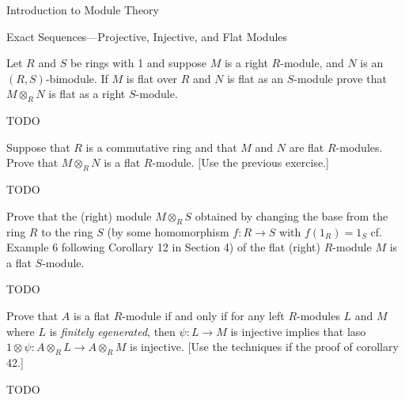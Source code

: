 \begin{chapter}{Introduction to Module Theory}
\begin{section}{Exact Sequences---Projective, Injective, and Flat Modules}
\begin{problem}\label{ex:10.5.21}
Let $R$ and $S$ be rings with 1 and suppose $M$ is a right $R$-module, and $N$ is an $(R,S)$-bimodule. If $M$ is flat over $R$ and $N$ is flat as an $S$-module prove that $M\otimes_R N$ is flat as a right $S$-module. 
\end{problem}
\begin{solution}TODO

\end{solution}\oneperpage



\begin{problem}\label{ex:10.5.22}
Suppose that $R$ is a commutative ring and that $M$ and $N$ are flat $R$-modules. Prove that $M\otimes_R N$ is a flat $R$-module. [Use the previous exercise.]
\end{problem}
\begin{solution}TODO

\end{solution}\oneperpage



\begin{problem}\label{ex:10.5.23}
Prove that the (right) module $M\otimes_R S$ obtained by changing the base from the ring $R$ to the ring $S$ (by some homomorphism $f:R\to S$ with $f(1_R) = 1_S$ cf. Example 6 following Corollary 12 in Section 4) of the flat (right) $R$-module $M$ is a flat $S$-module.
\end{problem}
\begin{solution}TODO

\end{solution}\oneperpage



\begin{problem}\label{ex:10.5.24}
Prove that $A$ is a flat $R$-module if and only if for any left $R$-modules $L$ and $M$ where $L$ is \emph{finitely egenerated}, then $\psi:L\to M$ is injective implies that laso $1\otimes \psi:A\otimes_RL\to A\otimes_RM$ is injective. [Use the techniques if the proof of corollary 42.]
\end{problem}
\begin{solution}TODO

\end{solution}\oneperpage




\end{section}
\end{chapter}
